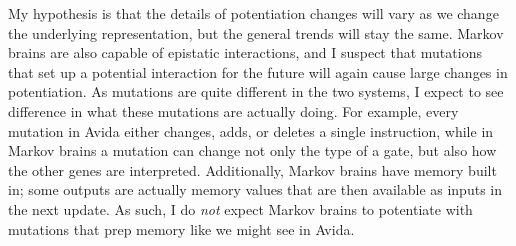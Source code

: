 My hypothesis is that the details of potentiation changes will vary as we change the underlying representation, but the general trends will stay the same. 
Markov brains are also capable of epistatic interactions, and I suspect that mutations that set up a potential interaction for the future will again cause large changes in potentiation. 
As mutations are quite different in the two systems, I expect to see difference in what these mutations are actually doing. 
For example, every mutation in Avida either changes, adds, or deletes a single instruction, while in Markov brains a mutation can change not only the type of a gate, but also how the other genes are interpreted.
Additionally, Markov brains have memory built in; some outputs are actually memory values that are then available as inputs in the next update. 
As such, I do \textit{not} expect Markov brains to potentiate with mutations that prep memory like we might see in Avida. 

